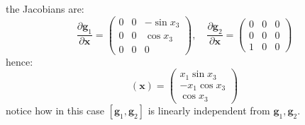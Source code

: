 \documentclass[10pt, a4paper]{report}
\begin{document}
the Jacobians are:\begin{equation}
    \frac{\partial  \mathbf g_1}{\partial \mathbf x}=\begin{pmatrix}
        0&0&-\sin x_3\\ 
        0&0&\cos x_3\\ 
        0&0&0
    \end{pmatrix},\quad 
    \frac{\partial  \mathbf g_2}{\partial \mathbf x}=\begin{pmatrix}
        0&0&0\\ 
        0&0&0\\ 
        1&0&0
    \end{pmatrix}
\end{equation}
hence:\begin{equation}
     [\mathbf g_1,\mathbf g_2](\mathbf x)=\begin{pmatrix}
        x_1\sin x_3\\ 
        -x_1\cos x_3 \\ 
        \cos x_3
     \end{pmatrix}
\end{equation}
notice how in this case $[\mathbf g_1,\mathbf g_2]$ is linearly independent from $\mathbf g_1,\mathbf g_2$.
\end{document}
